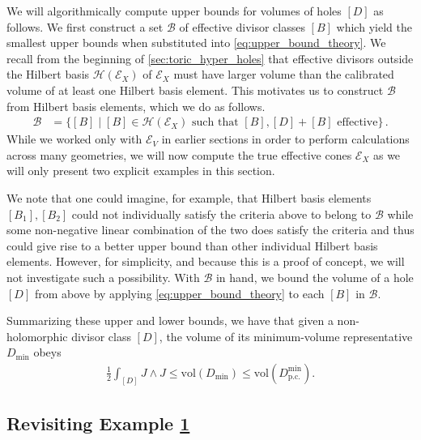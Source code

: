 \documentclass[11pt,dvipsnames]{article}
\theoremstyle{definition}
\begin{document}
We will algorithmically compute upper bounds for volumes of holes $[D]$ as follows. We first construct a set $\mathcal{B}$ of effective divisor classes $[B]$ which yield the smallest upper bounds when substituted into \cref{eq:upper_bound_theory}. We recall from the beginning of \cref{sec:toric_hyper_holes} that effective divisors outside the Hilbert basis $\mathcal{H}(\mathcal{E}_X)$ of $\mathcal{E}_X$ must have larger volume than the calibrated volume of at least one Hilbert basis element. This motivates us to construct $\mathcal{B}$ from Hilbert basis elements, which we do as follows.
\begin{equation}
    \label{eq:set_of_small_div}
    \begin{aligned}
        \mathcal{B} &= \Big\{ [B] \; \Big| \; [B] \in \mathcal{H}(\mathcal{E}_X) \text{ such that } [B], [D] + [B] \text{ effective} \Big\}\,.
    \end{aligned}
\end{equation}
While we worked only with $\mathcal{E}_V$ in earlier sections in order to perform calculations across many geometries, we will now compute the true effective cones $\mathcal{E}_X$ as we will only present two explicit examples in this section.

We note that one could imagine, for example, that Hilbert basis elements $[B_1], [B_2]$ could not individually satisfy the criteria above to belong to $\mathcal{B}$ while some non-negative linear combination of the two does satisfy the criteria and thus could give rise to a better upper bound than other individual Hilbert basis elements. However, for simplicity, and because this is a proof of concept, we will not investigate such a possibility. With $\mathcal{B}$ in hand, we bound the volume of a hole $[D]$ from above by applying \cref{eq:upper_bound_theory} to each $[B]$ in $\mathcal{B}$. 

Summarizing these upper and lower bounds, we have that given a non-holomorphic divisor class $[D]$, the volume of its minimum-volume representative $D_{\text{min}}$ obeys
\begin{align}
    \frac{1}{2} \int_{[D]} J \wedge J\leq \text{vol}(D_{\text{min}}) \leq \text{vol}(D_{\text{p.c.}}^{\text{min}}).
\end{align}

\subsection{Revisiting Example \hyperref[sec:h11=2]{1}}
\end{document}
